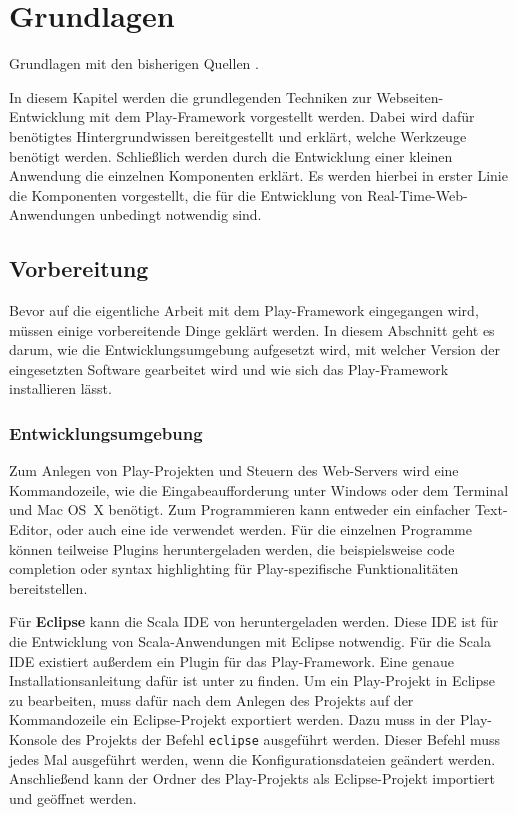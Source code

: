 
\chapter{Grundlagen} %
\label{cha:grundlagen}

Grundlagen mit den bisherigen Quellen \citealt{play_for_scala_v8}.

In diesem Kapitel werden die grundlegenden Techniken zur Webseiten-Entwicklung mit dem Play-Framework vorgestellt werden.
Dabei wird dafür benötigtes Hintergrundwissen bereitgestellt und erklärt, welche Werkzeuge benötigt werden.
Schließlich werden durch die Entwicklung einer kleinen Anwendung die einzelnen Komponenten erklärt.
Es werden hierbei in erster Linie die Komponenten vorgestellt, die für die Entwicklung von Real-Time-Web-Anwendungen unbedingt notwendig sind.


\section{Vorbereitung} %
\label{sec:vorbereitung}

Bevor auf die eigentliche Arbeit mit dem Play-Framework eingegangen wird, müssen einige vorbereitende Dinge geklärt werden. In diesem Abschnitt geht es darum, wie die Entwicklungsumgebung aufgesetzt wird, mit welcher Version der eingesetzten Software gearbeitet wird und wie sich das Play-Framework installieren lässt.

\subsection{Entwicklungsumgebung} %
\label{sub:entwicklungsumgebung}

Zum Anlegen von Play-Projekten und Steuern des Web-Servers wird eine Kommandozeile, wie die Eingabeaufforderung unter Windows oder dem Terminal und Mac OS~X benötigt.
Zum Programmieren kann entweder ein einfacher Text-Editor, oder auch eine \gls{ide} verwendet werden.
Für die einzelnen Programme können teilweise Plugins heruntergeladen werden, die beispielsweise code completion oder syntax highlighting für Play-spezifische Funktionalitäten bereitstellen.

Für \textbf{Eclipse} kann die Scala IDE von \citealt{scala_ide} heruntergeladen werden.
Diese IDE ist für die Entwicklung von Scala-Anwendungen mit Eclipse notwendig.
Für die Scala IDE existiert außerdem ein Plugin für das Play-Framework.
Eine genaue Installationsanleitung dafür ist unter \citealt{scala_ide_play_plugin} zu finden.
Um ein Play-Projekt in Eclipse zu bearbeiten, muss dafür nach dem Anlegen des Projekts auf der Kommandozeile ein Eclipse-Projekt exportiert werden.
Dazu muss in der Play-Konsole des Projekts der Befehl \lstinline|eclipse| ausgeführt werden.
Dieser Befehl muss jedes Mal ausgeführt werden, wenn die Konfigurationsdateien geändert werden.
Anschließend kann der Ordner des Play-Projekts als Eclipse-Projekt importiert und geöffnet werden.

